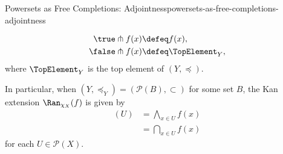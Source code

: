 \begin{proposition}{Powersets as Free Completions: Adjointness}{powersets-as-free-completions-adjointness}
\begin{itemize}
\begin{itemize}
\begin{align*}
                        \true\pitchfork f(x)  &\defeq f(x),\\
                        \false\pitchfork f(x) &\defeq \TopElement_{Y},
                    \end{align*}
                    where $\TopElement_{Y}$ is the top element of $(Y,\preceq)$.
            \end{itemize}
            In particular, when $(Y,\preceq_{Y})=(\mathcal{P}(B),\subset)$ for some set $B$, the Kan extension $\Ran_{\chi_{X}}(f)$ is given by
            \begin{align*}
                [\Ran_{\chi_{X}}(f)](U) &= \bigwedge_{x\in U}f(x)\\
                                        &= \bigcap_{x\in U}f(x)
            \end{align*}
            for each $U\in\mathcal{P}(X)$.
    \end{itemize}
\end{proposition}
